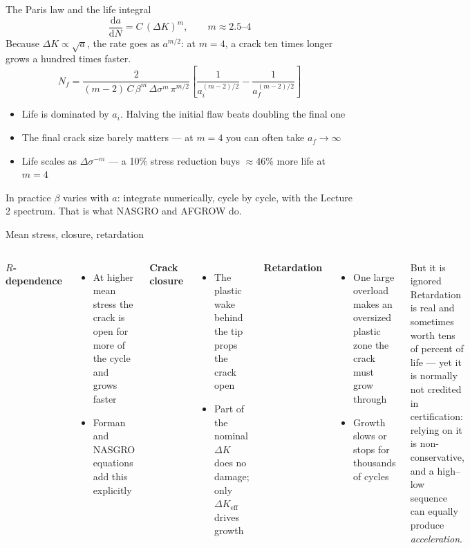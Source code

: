 \documentclass[aspectratio=169,10pt]{beamer}
\begin{document}
\begin{frame}{The Paris law and the life integral}
\[
\frac{\mathrm{d}a}{\mathrm{d}N}=C\,(\Delta K)^{m},\qquad m\approx2.5\text{--}4
\]
Because $\Delta K\propto\sqrt{a}$, the rate goes as $a^{m/2}$: at $m=4$, \alert{a crack ten times longer grows a hundred times faster}.
\[
N_f=\frac{2}{(m-2)\,C\,\beta^{m}\,\Delta\sigma^{m}\,\pi^{m/2}}
\left[\frac{1}{a_i^{(m-2)/2}}-\frac{1}{a_f^{(m-2)/2}}\right]
\]
\begin{itemize}
  \item \alert{Life is dominated by $a_i$.} Halving the initial flaw beats doubling the final one
  \item \alert{The final crack size barely matters} --- at $m=4$ you can often take $a_f\to\infty$
  \item \alert{Life scales as $\Delta\sigma^{-m}$} --- a 10\% stress reduction buys $\approx$46\% more life at $m=4$
\end{itemize}
\footnotesize In practice $\beta$ varies with $a$: integrate numerically, cycle by cycle, with the Lecture 2 spectrum. That is what NASGRO and AFGROW do.
\end{frame}

\begin{frame}{Mean stress, closure, retardation}
\begin{columns}[T]
\textbf{$R$-dependence}
\begin{itemize}\footnotesize
  \item At higher mean stress the crack is open for more of the cycle and grows faster
  \item Forman and NASGRO equations add this explicitly
\end{itemize}
\textbf{Crack closure}
\begin{itemize}\footnotesize
  \item The plastic wake behind the tip props the crack open
  \item Part of the nominal $\Delta K$ does no damage; only $\Delta K_{\text{eff}}$ drives growth
\end{itemize}
\textbf{Retardation}
\begin{itemize}\footnotesize
  \item One large overload makes an oversized plastic zone the crack must grow through
  \item Growth slows or stops for thousands of cycles
\end{itemize}
\begin{alertblock}{But it is ignored}
\footnotesize Retardation is real and sometimes worth tens of percent of life --- yet it is normally \alert{not credited} in certification: relying on it is non-conservative, and a high--low sequence can equally produce \emph{acceleration}.
\end{alertblock}
\end{columns}
\end{frame}
\end{document}
